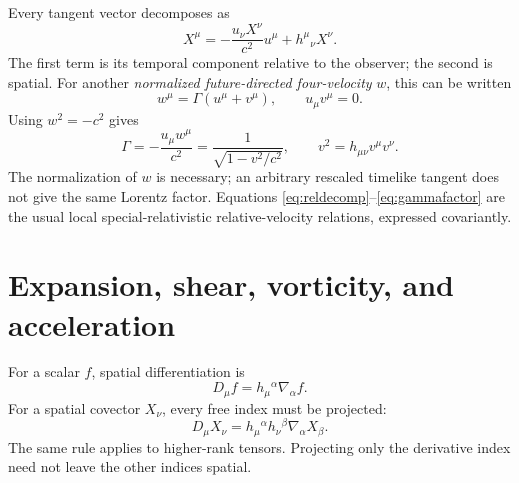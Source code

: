 \documentclass[11pt]{article}
\begin{document}
Every tangent vector decomposes as
\begin{equation}
X^\mu=-\frac{u_\nu X^\nu}{c^2}u^\mu+h^\mu{}_{\nu}X^\nu.
\label{eq:vectordecomp}
\end{equation}
The first term is its temporal component relative to the observer; the second is spatial. For another \emph{normalized future-directed four-velocity} $w$, this can be written
\begin{equation}
w^\mu=\Gamma(u^\mu+v^\mu),\qquad u_\mu v^\mu=0.
\label{eq:reldecomp}
\end{equation}
Using $w^2=-c^2$ gives
\begin{equation}
\Gamma=-\frac{u_\mu w^\mu}{c^2}
=\frac{1}{\sqrt{1-v^2/c^2}},\qquad
v^2=h_{\mu\nu}v^\mu v^\nu.
\label{eq:gammafactor}
\end{equation}
The normalization of $w$ is necessary; an arbitrary rescaled timelike tangent does not give the same Lorentz factor. Equations \eqref{eq:reldecomp}--\eqref{eq:gammafactor} are the usual local special-relativistic relative-velocity relations, expressed covariantly.

\section{Expansion, shear, vorticity, and acceleration}
For a scalar $f$, spatial differentiation is
\begin{equation}
D_\mu f=h_\mu{}^\alpha\nabla_\alpha f.
\label{eq:projectedderivative}
\end{equation}
For a spatial covector $X_\nu$, every free index must be projected:
\begin{equation}
D_\mu X_\nu=h_\mu{}^\alpha h_\nu{}^\beta\nabla_\alpha X_\beta.
\end{equation}
The same rule applies to higher-rank tensors. Projecting only the derivative index need not leave the other indices spatial.
\end{document}
